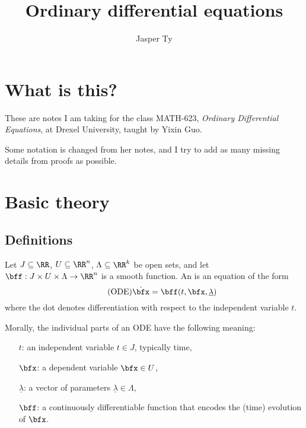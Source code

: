 \documentclass{article}
\title{Ordinary differential equations}
\author{Jasper Ty}
\date{}
\newcommand*\ullam{\underline{\lambda}}
\begin{document}
\maketitle

\section*{What is this?}

These are notes I am taking for the class MATH-623, \textit{Ordinary Differential Equations}, at Drexel University, taught by Yixin Guo.

Some notation is changed from her notes, and I try to add as many missing details from proofs as possible.

\tableofcontents

\newpage

\section{Basic theory}

\subsection{Definitions}

\begin{definition}
    Let $J \subseteq \RR$, $U \subseteq \RR^n$, $\Lambda \subseteq \RR^k$ be open sets, and let $\bff: J \times U \times \Lambda \to \RR^n$ is a smooth function.
    An  is an equation of the form 
    \begin{equation}
        \label{eqn:ODE}
        \tag{ODE}
        \dot{\bfx}
        =
        \bff(t, \bfx, \ullam)
    \end{equation}
    where the dot denotes differentiation with respect to the independent variable $t$.
\end{definition}

Morally, the individual parts of an ODE have the following meaning:
\begin{itemize}
    \item[$t$:]
        an independent variable $t \in J$, typically time,
    \item [$\bfx$:]
        a dependent variable $\bfx \in U$,
    \item[$\ullam$:]
        a vector of parameters $\ullam \in \Lambda$, 
    \item[$\bff$:]
        a continuously differentiable function that encodes the (time) evolution of $\bfx$.
\end{itemize}
\end{document}
